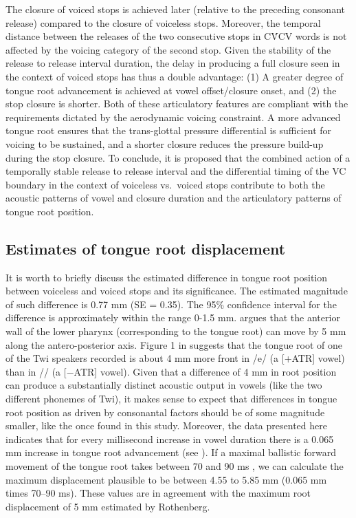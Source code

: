 \documentclass[preprint]{JASAnew}
\begin{document}
The closure of voiced stops is achieved later (relative to the preceding
consonant release) compared to the closure of voiceless stops. Moreover,
the temporal distance between the releases of the two consecutive stops
in CV́CV words is not affected by the voicing category of the second
stop. Given the stability of the release to release interval duration,
the delay in producing a full closure seen in the context of voiced
stops has thus a double advantage: (1) A greater degree of tongue root
advancement is achieved at vowel offset/closure onset, and (2) the stop
closure is shorter. Both of these articulatory features are compliant
with the requirements dictated by the aerodynamic voicing constraint. A
more advanced tongue root ensures that the trans-glottal pressure
differential is sufficient for voicing to be sustained, and a shorter
closure reduces the pressure build-up during the stop closure. To
conclude, it is proposed that the combined action of a temporally stable
release to release interval and the differential timing of the VC
boundary in the context of voiceless vs.~voiced stops contribute to both
the acoustic patterns of vowel and closure duration and the articulatory
patterns of tongue root position.

\hypertarget{estimates-of-tongue-root-displacement}{%
\subsection{Estimates of tongue root
displacement}\label{estimates-of-tongue-root-displacement}}

It is worth to briefly discuss the estimated difference in tongue root
position between voiceless and voiced stops and its significance. The
estimated magnitude of such difference is 0.77 mm (SE = 0.35). The 95\%
confidence interval for the difference is approximately within the range
0-1.5 mm. \citet{rothenberg1967} argues that the anterior wall of the
lower pharynx (corresponding to the tongue root) can move by 5 mm along
the antero-posterior axis. Figure 1 in \citet{kirkham2017} suggests that
the tongue root of one of the Twi speakers recorded is about 4 mm more
front in /e/ (a {[}+ATR{]} vowel) than in /\textepsilon{}/ (a {[}−ATR{]}
vowel). Given that a difference of 4 mm in root position can produce a
substantially distinct acoustic output in vowels (like the two different
phonemes of Twi), it makes sense to expect that differences in tongue
root position as driven by consonantal factors should be of some
magnitude smaller, like the once found in this study. Moreover, the data
presented here indicates that for every millisecond increase in vowel
duration there is a 0.065 mm increase in tongue root advancement (see
). If a maximal ballistic forward movement of the
tongue root takes between 70 and 90 ms \citep{rothenberg1967}, we can
calculate the maximum displacement plausible to be between 4.55 to 5.85
mm (0.065 mm times 70--90 ms). These values are in agreement with the
maximum root displacement of 5 mm estimated by Rothenberg.
\end{document}
